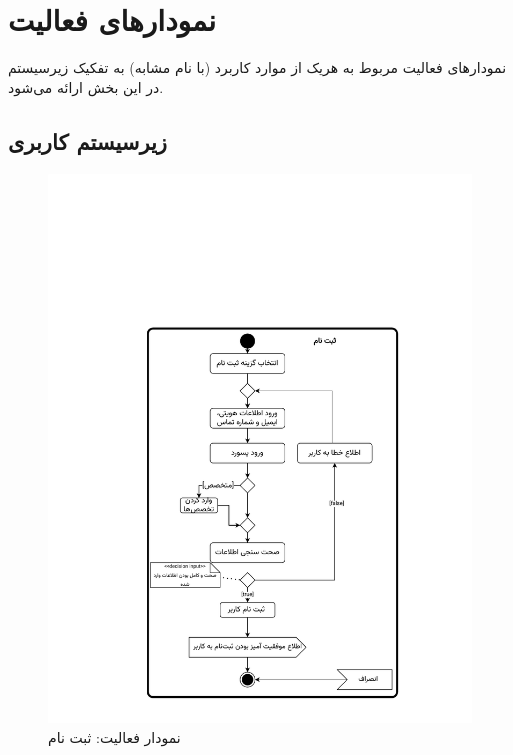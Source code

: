 \chapter{نمودارهای فعالیت}

نمودارهای فعالیت مربوط به هریک از موارد کاربرد (با نام مشابه) به تفکیک زیرسیستم در این بخش ارائه می‌شود.

\section{زیرسیستم کاربری}

\begin{figure}[ht!]
	\centering
	\includegraphics[scale=0.8, page=1]{figs/OOD-activity1-10.pdf}
	\caption{نمودار فعالیت: ثبت نام}
\end{figure}
\FloatBarrier
\newpage

